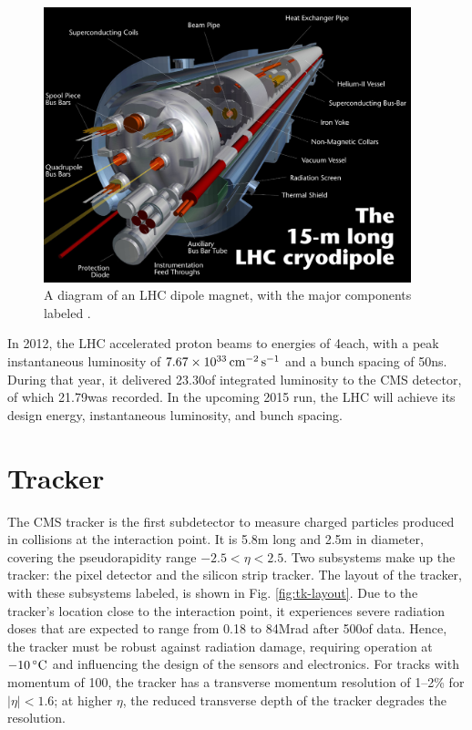\begin{figure}[hbt]
\begin{center}
\includegraphics[width=0.95\textwidth]{figures/lhc-pho-1998-299.jpg}
\caption{A diagram of an LHC dipole magnet, with the major components labeled \cite{Dailler:842253}.}
\label{fig:lhc-dipole}
\end{center}
\end{figure}

In 2012, the LHC accelerated proton beams to energies of 4\TeV each, with a peak instantaneous luminosity of $7.67\times10^{33}\,\text{cm}^\text{$-$2}\,\text{s}^\text{$-$1}$ and a bunch spacing of 50\unit{ns}. During that year, it delivered 23.30\fbinv of integrated luminosity to the CMS detector, of which 21.79\fbinv was recorded. In the upcoming 2015 run, the LHC will achieve its design energy, instantaneous luminosity, and bunch spacing.

\section{Tracker}

The CMS tracker is the first subdetector to measure charged particles produced in collisions at the interaction point. It is 5.8\unit{m} long and 2.5\unit{m} in diameter, covering the pseudorapidity range $-2.5 < \eta < 2.5$. Two subsystems make up the tracker: the pixel detector and the silicon strip tracker. The layout of the tracker, with these subsystems labeled, is shown in Fig. \ref{fig:tk-layout}. Due to the tracker's location close to the interaction point, it experiences severe radiation doses that are expected to range from 0.18 to 84\unit{Mrad} after 500\fbinv of data. Hence, the tracker must be robust against radiation damage, requiring operation at $-10\,^\circ\text{C}$ and influencing the design of the sensors and electronics. For tracks with momentum of 100\GeV, the tracker has a transverse momentum resolution of 1--2\% for $|\eta|<1.6$; at higher $\eta$, the reduced transverse depth of the tracker degrades the resolution.

